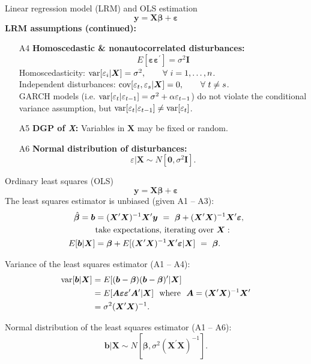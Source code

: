 \documentclass{beamer}
\begin{document}
\begin{frame}{Linear regression model (LRM) and OLS estimation}
$$
\bm{y} = \bm{X\beta} + \bm{\varepsilon}
$$
\textbf{LRM assumptions (continued):}
\medskip
\begin{enumerate}
    \item[A4] \textbf{Homoscedastic \& nonautocorrelated disturbances:}$$E[\bm{\varepsilon\varepsilon}^{\prime}]=\sigma^2\bm{I}$$ Homoscedasticity: $\textnormal{var}[\varepsilon_i|\bm{X}]=\sigma^2, \qquad \forall~i=1,\dots,n$.\\Independent disturbances: $\textnormal{cov}[\varepsilon_t,\varepsilon_s|\bm{X}]=0, \qquad \forall~t \neq s$.\\ \smallskip GARCH models (i.e. $\textnormal{var}[\varepsilon_t|\varepsilon_{t-1}]=\sigma^2+\alpha \varepsilon_{t-1}$) do not violate the conditional variance assumption, but $\textnormal{var}[\varepsilon_t|\varepsilon_{t-1}] \neq \textnormal{var}[\varepsilon_t]$.
    \item[A5] \textbf{DGP of \textit{X}:} Variables in $\bm{X}$ may be fixed or random.
    \item[A6] \textbf{Normal distribution of disturbances:} $$\varepsilon | \bm{X} \sim N[\bm{0}, \sigma^2\bm{I}].$$
\end{enumerate}
\end{frame}
\begin{frame}{Ordinary least squares (OLS)}
\vspace{-0.3cm}
$$
\bm{y} = \bm{X\beta} + \bm{\varepsilon}
$$
\medskip
The least squares estimator is unbiased (given A1 -- A3):
\begin{align*}
    \hat{\bm{\beta}}=\bm{b}&=(\bm{X}^{\prime}\bm{X})^{-1} \bm{X}^{\prime}\bm{y}~=~\bm{\beta}+(\bm{X}^{\prime}\bm{X})^{-1} \bm{X}^{\prime}\bm{\varepsilon}, \\
    &\textnormal{take expectations, iterating over}~\bm{X}:\\
    E[\bm{b}|\bm{X}]&= \bm{\beta}+E[(\bm{X}^{\prime}\bm{X})^{-1} \bm{X}^{\prime}\bm{\varepsilon}|\bm{X}]~=~\bm{\beta}.\\
\end{align*}

Variance of the least squares estimator (A1 -- A4):
\begin{align*}
    \textnormal{var}[\bm{b}|\bm{X}]&=E[(\bm{b}-\bm{\beta})(\bm{b}-\bm{\beta})^{\prime}|\bm{X}]\\
    &=E[\bm{A \varepsilon \varepsilon}^{\prime}\bm{A}^{\prime}|\bm{X}] \textnormal{~~where~~}\bm{A}=(\bm{X}^{\prime}\bm{X})^{-1} \bm{X}^{\prime}\\
    &= \sigma^2 (\bm{X}^{\prime}\bm{X})^{-1}.\\
\end{align*}

Normal distribution of the least squares estimator (A1 -- A6):
$$\bm{b} | \bm{X} \sim N[\bm{\beta}, \sigma^2(\bm{X}^{\prime}\bm{X})^{-1}].$$
    
\end{frame}
\end{document}

